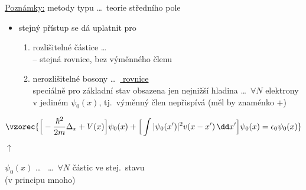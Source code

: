 \underline{Poznámky:} \quad metody typu  \quad \dots\ teorie středního pole
\begin{itemize}
  \item stejný přístup se dá uplatnit pro
  \begin{enumerate}[label=(\alph*)]
    \item rozlišitelné částice \dots\  \\
          -- stejná rovnice, bez výměnného členu
    \item nerozlišitelné bosony \dots\ \underline{ rovnice} \\
          speciálně pro základní stav obsazena jen nejnižší hladina \dots\ $\forall N$ elektrony v jediném $\psi_0(x)$, tj.\ výměnný člen nepřispívá (měl by znaménko $+$)
  \end{enumerate}
\end{itemize}
\[
  \vzorec{\Big[-\frac{\hbar^2}{2m}\Delta_x + V(x)\Big]\psi_0(x) + \Big[\int|\psi_0(x')|^2v(x - x')\,\dd x'\Big]\psi_0(x) = \epsilon_0\psi_0(x)}
\]
\hspace*{5cm} \textcolor{OliveGreen}{$\uparrow$ }

$\psi_0(x)$ \dots\  \quad \dots\ $\forall N$ částic ve stej.\ stavu \\
\hspace*{9.3cm} (v principu mnoho)

